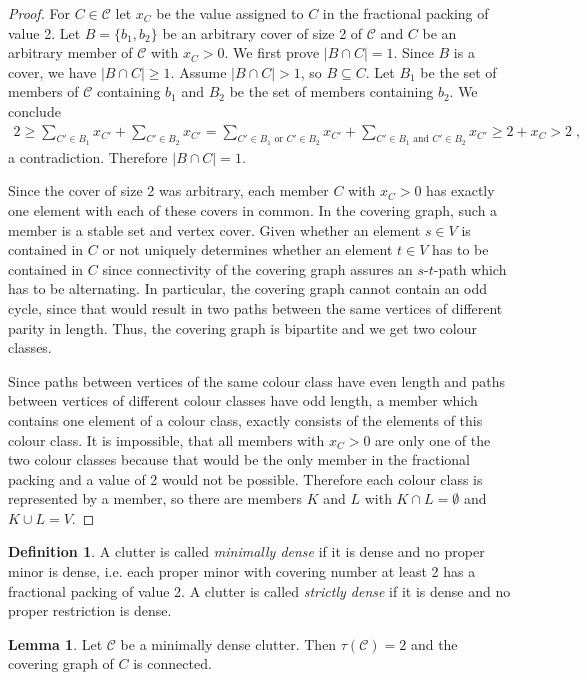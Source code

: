 \documentclass[a4paper, 12pt]{scrbook}
\theoremstyle{definition}
\newtheorem*{definition}{Definition}
\newtheorem{lemma}[theorem]{Lemma}
\begin{document}
   \begin{proof}
       For $C \in \mathcal{C}$ let $x_C$ be the value assigned to $C$ in the fractional packing of value 2.
       Let $B=\{b_1,b_2\}$ be an arbitrary cover of size 2 of $\mathcal{C}$ and $C$ be an arbitrary member of $\mathcal{C}$ with $x_{C} > 0$.
       We first prove $|B\cap C| = 1$.
       Since $B$ is a cover, we have $|B\cap C| \geq 1$.
       Assume $|B \cap C| > 1$, so $B \subseteq C$.
       Let $B_1$ be the set of members of $\mathcal{C}$ containing $b_1$ and $B_2$ be the set of members containing $b_2$.
       We conclude
       \begin{align*}
           2 \geq \sum_{C'\in B_1} x_{C'} + \sum_{C' \in B_2} x_{C'} = \sum_{C' \in B_1 \text{ or } C' \in B_2} x_{C'} + \sum_{C' \in B_1 \text{ and } C' \in B_2} x_{C'} \geq 2 + x_C > 2 \;,
       \end{align*}
       a contradiction. Therefore $|B\cap C| = 1$.

       Since the cover of size 2 was arbitrary, each member $C$ with $x_C>0$ has exactly one element with each of these covers in common.
       In the covering graph, such a member is a stable set and vertex cover.
       Given whether an element $s \in V$ is contained in $C$ or not uniquely determines whether an element $t \in V$ has to be contained in $C$ since connectivity of the covering graph assures an $s$-$t$-path which has to be alternating.
       In particular, the covering graph cannot contain an odd cycle, since that would result in two paths between the same vertices of different parity in length. Thus, the covering graph is bipartite and we get two colour classes.

       Since paths between vertices of the same colour class have even length and paths between vertices of different colour classes have odd length, a member which contains one element of a colour class, exactly consists of the elements of this colour class.
       It is impossible, that all members with $x_C > 0$ are only one of the two colour classes because that would be the only member in the fractional packing and a value of 2 would not be possible.
       Therefore each colour class is represented by a member, so there are members $K$ and $L$ with $K \cap L = \emptyset$ and $K \cup L = V$.

   \end{proof}

   \begin{definition}
       A clutter is called \emph{minimally dense} if it is dense and no proper minor is dense, i.e. each proper minor with covering number at least 2 has a fractional packing of value 2.
       A clutter is called \emph{strictly dense} if it is dense and no proper restriction is dense.
   \end{definition}
   \begin{lemma}\label{connectivity}
       Let $\mathcal{C}$ be a minimally dense clutter.
       Then $\tau(\mathcal{C})=2$ and the covering graph of $C$ is connected.
   \end{lemma}
\end{document}
